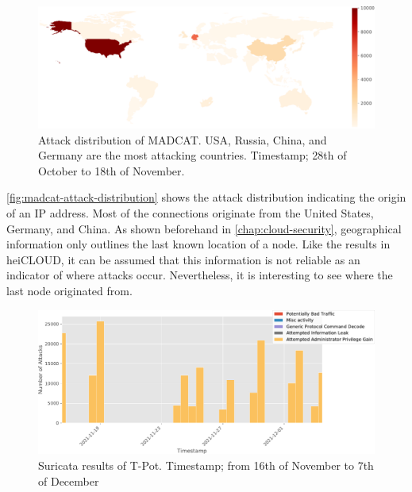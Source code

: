 \begin{figure}[ht]
    \centering
    \includegraphics[width=\textwidth]{figures/madcat-overview-map.pdf}
    \caption[Attack distribution of MADCAT]{
        Attack distribution of MADCAT.
        USA, Russia, China, and Germany are the most attacking countries.
        Timestamp; 28th of October to 18th of November.
    }
    \label{fig:madcat-attack-distribution}
\end{figure}

\autoref{fig:madcat-attack-distribution} shows the attack distribution indicating the origin of an IP address.
Most of the connections originate from the United States, Germany, and China.
As shown beforehand in \autoref{chap:cloud-security}, geographical information only outlines the last known location of a node.
Like the results in heiCLOUD, it can be assumed that this information is not reliable as an indicator of where attacks occur.
Nevertheless, it is interesting to see where the last node originated from.

\begin{figure}[ht]
    \centering
    \includegraphics[width=\textwidth]{figures/madcat-suricata-alerts.pdf}
    \caption[Suricata results of T-Pot]{
        Suricata results of T-Pot.
        Timestamp; from 16th of November to 7th of December
    }
    \label{fig:suricata-distribution}
\end{figure}

